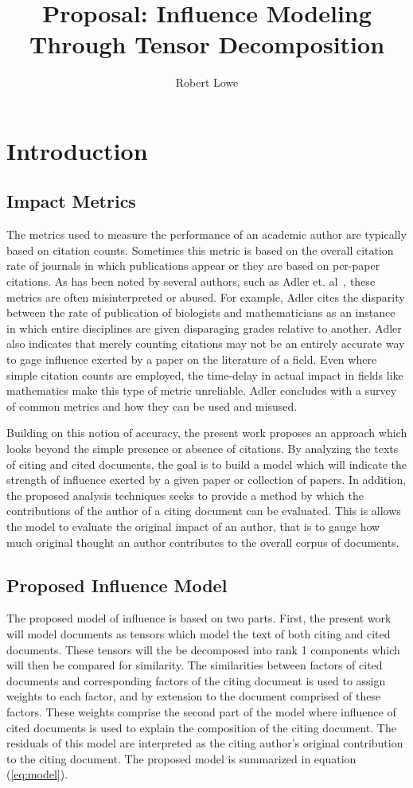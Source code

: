 \documentclass{article}
\title{Proposal: Influence Modeling Through Tensor Decomposition}
\author{Robert Lowe}
\begin{document}
\maketitle

\section{Introduction}
\subsection{Impact Metrics}
The metrics used to measure the performance of an academic author are
typically based on citation counts.  Sometimes this metric is based on
the overall citation rate of journals in which publications appear or
they are based on per-paper citations.  As has been noted by several
authors, such as Adler et. al~\cite{adler2009}, these metrics are
often misinterpreted or abused.  For example, Adler cites the
disparity between the rate of publication of biologists and
mathematicians as an instance in which entire disciplines are given
disparaging grades relative to another. Adler also indicates that
merely counting citations may not be an entirely accurate way to gage
influence exerted by a paper on the literature of a field.  Even where
simple citation counts are employed, the time-delay in actual impact
in fields like mathematics make this type of metric unreliable.  Adler
concludes with a survey of common metrics and how they can be used and
misused.

Building on this notion of accuracy, the present work proposes an
approach which looks beyond the simple presence or absence of
citations.  By analyzing the texts of citing and cited documents, the
goal is to build a model which will indicate the strength of influence
exerted by a given paper or collection of papers.  In addition, the
proposed analysis techniques seeks to provide a method by which the
contributions of the author of a citing document can be evaluated.
This is allows the model to evaluate the original impact of an author,
that is to gauge how much original thought an author contributes to
the overall corpus of documents. 

\subsection{Proposed Influence Model}
The proposed model of influence is based on two parts.  First, the
present work will model documents as tensors which model the text of
both citing and cited documents. These tensors will the be decomposed
into rank 1 components which will then be compared for similarity.
The similarities between factors of cited documents and corresponding
factors of the citing document is used to assign weights to each
factor, and by extension to the document comprised of these factors.
These weights comprise the second part of the model where influence of
cited documents is used to explain the composition of the citing
document.  The residuals of this model are interpreted as the citing
author's original contribution to the citing document. The proposed
model is summarized in equation (\ref{eq:model}). 
\end{document}
